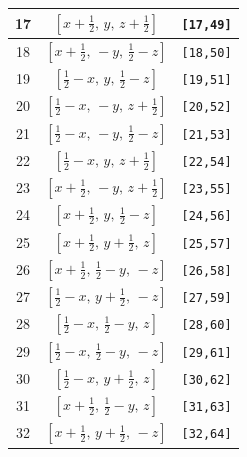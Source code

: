 \documentclass[fleqn,8pt]{jsarticle}
\begin{document}
\begin{longtable}{ccc}
17 & $\left[ x + \frac{1}{2},\, y,\, z + \frac{1}{2} \right]$ & {\tt [17,49]} \\ \hline
18 & $\left[ x + \frac{1}{2},\, - y,\, \frac{1}{2} - z \right]$ & {\tt [18,50]} \\ \hline
19 & $\left[ \frac{1}{2} - x,\, y,\, \frac{1}{2} - z \right]$ & {\tt [19,51]} \\ \hline
20 & $\left[ \frac{1}{2} - x,\, - y,\, z + \frac{1}{2} \right]$ & {\tt [20,52]} \\ \hline
21 & $\left[ \frac{1}{2} - x,\, - y,\, \frac{1}{2} - z \right]$ & {\tt [21,53]} \\ \hline
22 & $\left[ \frac{1}{2} - x,\, y,\, z + \frac{1}{2} \right]$ & {\tt [22,54]} \\ \hline
23 & $\left[ x + \frac{1}{2},\, - y,\, z + \frac{1}{2} \right]$ & {\tt [23,55]} \\ \hline
24 & $\left[ x + \frac{1}{2},\, y,\, \frac{1}{2} - z \right]$ & {\tt [24,56]} \\ \hline
25 & $\left[ x + \frac{1}{2},\, y + \frac{1}{2},\, z \right]$ & {\tt [25,57]} \\ \hline
26 & $\left[ x + \frac{1}{2},\, \frac{1}{2} - y,\, - z \right]$ & {\tt [26,58]} \\ \hline
27 & $\left[ \frac{1}{2} - x,\, y + \frac{1}{2},\, - z \right]$ & {\tt [27,59]} \\ \hline
28 & $\left[ \frac{1}{2} - x,\, \frac{1}{2} - y,\, z \right]$ & {\tt [28,60]} \\ \hline
29 & $\left[ \frac{1}{2} - x,\, \frac{1}{2} - y,\, - z \right]$ & {\tt [29,61]} \\ \hline
30 & $\left[ \frac{1}{2} - x,\, y + \frac{1}{2},\, z \right]$ & {\tt [30,62]} \\ \hline
31 & $\left[ x + \frac{1}{2},\, \frac{1}{2} - y,\, z \right]$ & {\tt [31,63]} \\ \hline
32 & $\left[ x + \frac{1}{2},\, y + \frac{1}{2},\, - z \right]$ & {\tt [32,64]} \\
\end{longtable}
\end{document}
